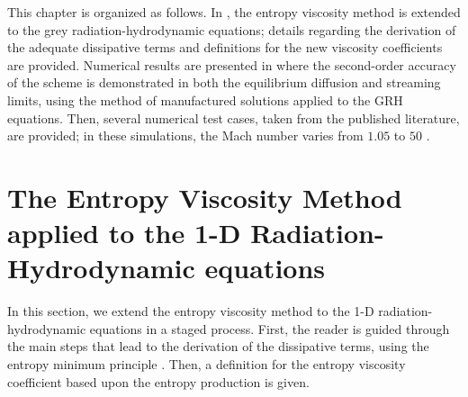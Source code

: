 This chapter is organized as follows. In , the entropy viscosity method is extended to the grey radiation-hydrodynamic equations;  details regarding the derivation of the adequate dissipative terms and definitions for the new viscosity coefficients are provided. Numerical results are presented in  where the second-order accuracy of the scheme is demonstrated in both the equilibrium diffusion and streaming limits, using the method of manufactured solutions applied to the GRH equations. Then, several numerical test cases, taken from the published literature, are provided; in these simulations, the Mach number varies from $1.05$ to $50$ \cite{LowrieEdwards}.

\section{The Entropy Viscosity Method applied to the 1-D Radiation-Hydrodynamic equations}\label{sec:entropy-visc-meth_sct5}

In this section, we extend the entropy viscosity method \cite{jlg1, jlg2, valentin} to the 1-D radiation-hydrodynamic equations in a staged process. First, the reader is guided through the main steps that lead to the derivation of the dissipative terms, using the entropy minimum principle \cite{entropy}. Then, a definition for the entropy viscosity coefficient based upon the entropy production is given. 

